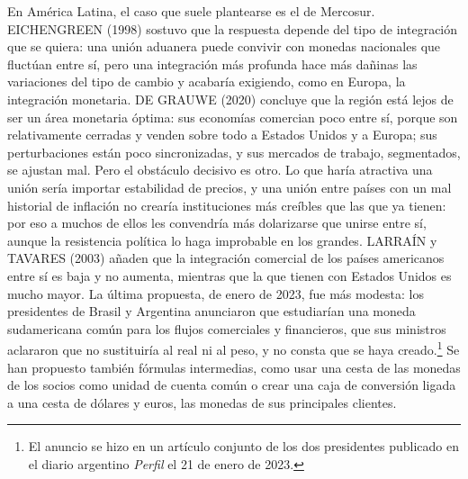 \documentclass[10pt,a4paper]{article}
\begin{document}
En América Latina, el caso que suele plantearse es el de Mercosur. EICHENGREEN (1998) sostuvo que la respuesta depende del tipo de integración que se quiera: una unión aduanera puede convivir con monedas nacionales que fluctúan entre sí, pero una integración más profunda hace más dañinas las variaciones del tipo de cambio y acabaría exigiendo, como en Europa, la integración monetaria. DE GRAUWE (2020) concluye que la región está lejos de ser un área monetaria óptima: sus economías comercian poco entre sí, porque son relativamente cerradas y venden sobre todo a Estados Unidos y a Europa; sus perturbaciones están poco sincronizadas, y sus mercados de trabajo, segmentados, se ajustan mal. Pero el obstáculo decisivo es otro. Lo que haría atractiva una unión sería importar estabilidad de precios, y una unión entre países con un mal historial de inflación no crearía instituciones más creíbles que las que ya tienen: por eso a muchos de ellos les convendría más dolarizarse que unirse entre sí, aunque la resistencia política lo haga improbable en los grandes. LARRAÍN y TAVARES (2003) añaden que la integración comercial de los países americanos entre sí es baja y no aumenta, mientras que la que tienen con Estados Unidos es mucho mayor. La última propuesta, de enero de 2023, fue más modesta: los presidentes de Brasil y Argentina anunciaron que estudiarían una moneda sudamericana común para los flujos comerciales y financieros, que sus ministros aclararon que no sustituiría al real ni al peso, y no consta que se haya creado.\footnote{%
    El anuncio se hizo en un artículo conjunto de los dos presidentes publicado en el diario argentino \textit{Perfil} el 21 de enero de 2023.
} Se han propuesto también fórmulas intermedias, como usar una cesta de las monedas de los socios como unidad de cuenta común o crear una caja de conversión ligada a una cesta de dólares y euros, las monedas de sus principales clientes.
\end{document}

